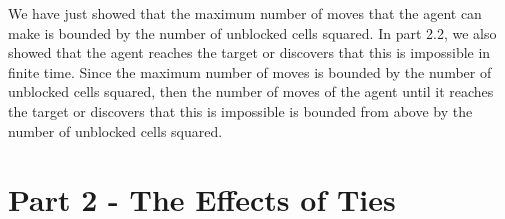 \documentclass{article}
\begin{document}
We have just showed that the maximum number of moves that the agent can make is bounded by the number of unblocked cells squared. In part 2.2, we also showed that the agent reaches the target or discovers that this is impossible in finite time. Since the maximum number of moves is bounded by the number of unblocked cells squared, then the number of moves of the agent until it reaches the target or discovers that this is impossible is bounded from above by the number of unblocked cells squared.


\section{Part 2 - The Effects of Ties}
\end{document}

